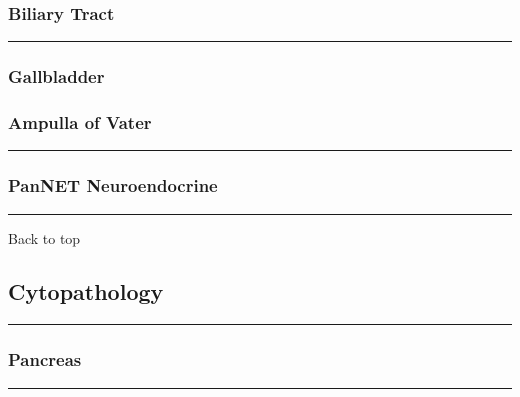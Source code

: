 \documentclass[]{article}
\begin{document}
\hypertarget{biliary-tract}{%
\subsubsection{Biliary Tract}\label{biliary-tract}}

\begin{center}\rule{0.5\linewidth}{\linethickness}\end{center}

\hypertarget{gallbladder}{%
\subsubsection{Gallbladder}\label{gallbladder}}

\hypertarget{ampulla-of-vater}{%
\subsubsection{Ampulla of Vater}\label{ampulla-of-vater}}

\begin{center}\rule{0.5\linewidth}{\linethickness}\end{center}

\hypertarget{pannet-neuroendocrine}{%
\subsubsection{PanNET Neuroendocrine}\label{pannet-neuroendocrine}}

\begin{center}\rule{0.5\linewidth}{\linethickness}\end{center}

Back to top

\pagebreak

\hypertarget{cytopathology}{%
\subsection{Cytopathology}\label{cytopathology}}

\begin{center}\rule{0.5\linewidth}{\linethickness}\end{center}

\hypertarget{pancreas-1}{%
\subsubsection{Pancreas}\label{pancreas-1}}

\begin{center}\rule{0.5\linewidth}{\linethickness}\end{center}
\end{document}
